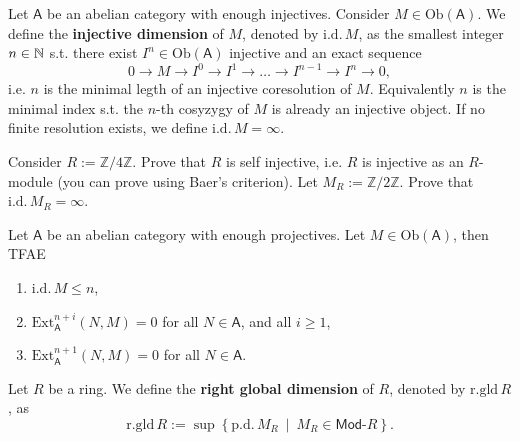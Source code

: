 \begin{defn}
	Let $\mathsf{A}$ be an abelian category with enough injectives.
	Consider $M \in \mathrm{Ob} \left(\mathsf{A}\right)$.
	We define the \textbf{injective dimension} of $M$, 
	denoted by $\mathrm{i.d.}\, M$, as the smallest integer $n \in \mathbb{N}$ s.t.
	there exist $I^n \in \mathrm{Ob} \left(\mathsf{A}\right)$ injective and an exact sequence
	\begin{equation}
	0 \to M \to I^0 \to I^1 \to \ldots \to
	I^{n-1} \to I^n \to 0
	,\end{equation} 
	i.e. $n$ is the minimal legth of an injective coresolution of $M$.
	Equivalently $n$ is the minimal index s.t. the $n$-th cosyzygy of $M$ is already
	an injective object.
	If no finite resolution exists, we define $\mathrm{i.d.}\, M = \infty$.
\end{defn}

\begin{ex}
	Consider $R := \mathbb{Z}/4\mathbb{Z}$.
	Prove that $R$ is self injective, i.e. $R$ is injective as an $R$-module
	(you can prove using Baer's criterion).
	Let $M_R := \mathbb{Z}/2\mathbb{Z}$.
	Prove that $\mathrm{i.d.}\, M_R = \infty$.
\end{ex} 

\begin{prop}
	Let $\mathsf{A}$ be an abelian category with enough projectives.
	Let $M \in \mathrm{Ob} \left(\mathsf{A}\right)$, then TFAE
	\begin{enumerate}
		\item $\mathrm{i.d.}\, M \leq n$,
		\item $\mathrm{Ext}^{n+i}_{\mathsf{A}} (N,M) = 0$ for all $N \in \mathsf{A}$, and all $i \geq 1$,
		\item $\mathrm{Ext}^{n+1}_{\mathsf{A}} (N,M) = 0$ for all $N \in \mathsf{A}$.
	\end{enumerate}
\end{prop} 

\begin{defn}
	Let $R$ be a ring.
	We define the \textbf{right global dimension} of $R$, denoted by
	$\mathrm{r.gld}\, R$, as
	\begin{equation}
	\mathrm{r.gld}\, R := \sup \left\{ \mathrm{p.d.}\, M_R \ \middle|\ M_R \in \mathsf{Mod}\text{-}R \right\}
	.\end{equation} 
\end{defn}

